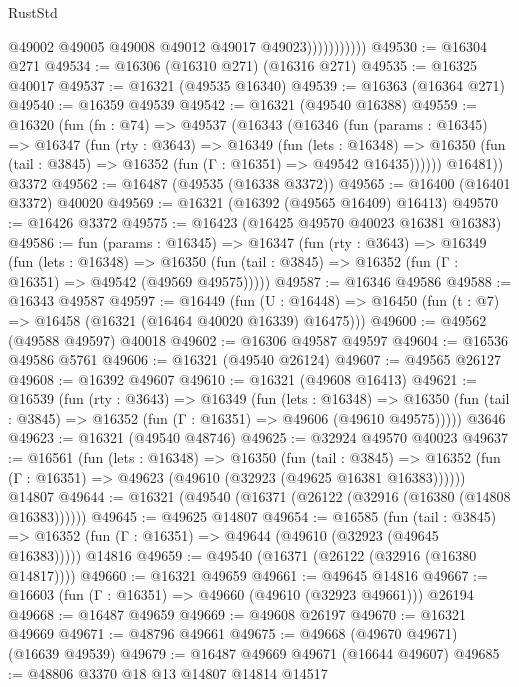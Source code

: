 \begin{lexlean}{RustStd}
\begin{coremodule}
                          @49002
                          @49005
                          @49008
                          @49012
                          @49017
                          @49023)))))))))))
@49530 := @16304 @271
@49534 := @16306 (@16310 @271) (@16316 @271)
@49535 := @16325 @40017
@49537 := @16321 (@49535 @16340)
@49539 := @16363 (@16364 @271)
@49540 := @16359 @49539
@49542 := @16321 (@49540 @16388)
@49559 := @16320
    (fun (fn : @74) =>
    @49537
      (@16343
        (@16346
          (fun (params : @16345) =>
          @16347
            (fun (rty : @3643) =>
            @16349
              (fun (lets : @16348) =>
              @16350 (fun (tail : @3845) => @16352 (fun (Γ : @16351) => @49542 @16435))))))
        @16481))
    @3372
@49562 := @16487 (@49535 (@16338 @3372))
@49565 := @16400 (@16401 @3372) @40020
@49569 := @16321 (@16392 (@49565 @16409) @16413)
@49570 := @16426 @3372
@49575 := @16423 (@16425 @49570 @40023 @16381 @16383)
@49586 := fun (params : @16345) =>
  @16347
    (fun (rty : @3643) =>
    @16349
      (fun (lets : @16348) =>
      @16350 (fun (tail : @3845) => @16352 (fun (Γ : @16351) => @49542 (@49569 @49575)))))
@49587 := @16346 @49586
@49588 := @16343 @49587
@49597 := @16449
    (fun (U : @16448) => @16450 (fun (t : @7) => @16458 (@16321 (@16464 @40020 @16339) @16475)))
@49600 := @49562 (@49588 @49597) @40018
@49602 := @16306 @49587 @49597
@49604 := @16536 @49586 @5761
@49606 := @16321 (@49540 @26124)
@49607 := @49565 @26127
@49608 := @16392 @49607
@49610 := @16321 (@49608 @16413)
@49621 := @16539
    (fun (rty : @3643) =>
    @16349
      (fun (lets : @16348) =>
      @16350 (fun (tail : @3845) => @16352 (fun (Γ : @16351) => @49606 (@49610 @49575)))))
    @3646
@49623 := @16321 (@49540 @48746)
@49625 := @32924 @49570 @40023
@49637 := @16561
    (fun (lets : @16348) =>
    @16350
      (fun (tail : @3845) =>
      @16352 (fun (Γ : @16351) => @49623 (@49610 (@32923 (@49625 @16381 @16383))))))
    @14807
@49644 := @16321 (@49540 (@16371 (@26122 (@32916 (@16380 (@14808 @16383))))))
@49645 := @49625 @14807
@49654 := @16585
    (fun (tail : @3845) => @16352 (fun (Γ : @16351) => @49644 (@49610 (@32923 (@49645 @16383)))))
    @14816
@49659 := @49540 (@16371 (@26122 (@32916 (@16380 @14817))))
@49660 := @16321 @49659
@49661 := @49645 @14816
@49667 := @16603 (fun (Γ : @16351) => @49660 (@49610 (@32923 @49661))) @26194
@49668 := @16487 @49659
@49669 := @49608 @26197
@49670 := @16321 @49669
@49671 := @48796 @49661
@49675 := @49668 (@49670 @49671) (@16639 @49539)
@49679 := @16487 @49669 @49671 (@16644 @49607)
@49685 := @48806 @3370 @18 @13 @14807 @14814 @14517

\end{coremodule}
\end{lexlean}
